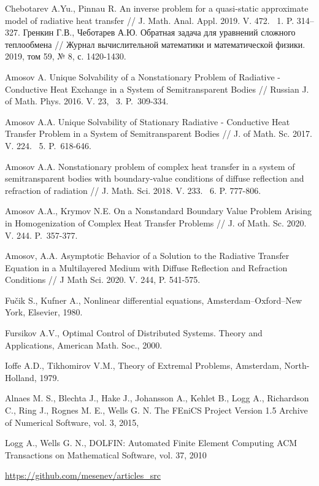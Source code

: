 \documentclass[12pt]{article}
\begin{document}
\begin{thebibliography}{999}
        Chebotarev A.Yu., Pinnau R. An inverse problem for a quasi-static approximate model of radiative heat transfer // J. Math. Anal. Appl. 2019. V. 472. \textnumero~1. P. 314--327.
         Гренкин Г.В., Чеботарев А.Ю. Обратная задача для уравнений сложного теплообмена // Журнал вычислительной математики и математической физики. 2019, том 59, № 8, с. 1420-1430.

        Amosov A. Unique Solvability of a Nonstationary Problem of Radiative - Conductive
        Heat Exchange in a System of Semitransparent Bodies // Russian J. of Math.
        Phys. 2016. V. 23, \textnumero~3. P.~309-334.

        Amosov A.A. Unique Solvability of Stationary Radiative - Conductive Heat Transfer
        Problem in a System of Semitransparent Bodies // J. of Math. Sc. 2017. V. 224. \textnumero~5. P.~618-646.

        Amosov A.A. Nonstationary problem of complex heat transfer in a system of semitransparent bodies with boundary-value conditions of diffuse reflection and refraction of radiation // J. Math. Sci. 2018. V. 233. \textnumero~6. P. 777-806.

        Amosov A.A., Krymov N.E. On a Nonstandard Boundary Value Problem Arising in Homogenization of Complex Heat Transfer Problems // J. of Math. Sc. 2020. V. 244. P.~357-377.

        Amosov, A.A. Asymptotic Behavior of a Solution to the Radiative Transfer Equation in a Multilayered Medium with Diffuse Reflection and Refraction Conditions // J Math Sci. 2020. V. 244, P. 541-575.

         Fu\v{c}ik S., Kufner A., Nonlinear differential equations,
        Amsterdam--Oxford--New York,  Elsevier, 1980.

         Fursikov A.V., Optimal Control of Distributed
        Systems. Theory and Applications, American Math. Soc., 2000.

         Ioffe A.D., Tikhomirov V.M., Theory of Extremal
        Problems, Amsterdam, North-Holland, 1979.

         Alnaes M. S., Blechta J., Hake J., Johansson A.,
        Kehlet B., Logg A., Richardson C., Ring J., Rognes M. E., Wells G. N.
        The FEniCS Project Version 1.5
        Archive of Numerical Software, vol. 3, 2015,

         Logg A., Wells G. N., DOLFIN: Automated Finite Element Computing
        ACM Transactions on Mathematical Software, vol. 37, 2010

         \url{https://github.com/mesenev/articles_src}


    \end{thebibliography}
\end{document}
